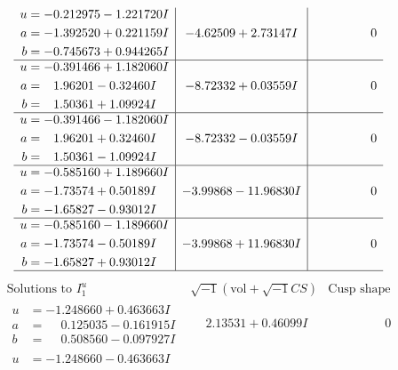 \documentclass[1p]{elsarticle_modified}
\theoremstyle{definition}
\newcommand{\I}{\sqrt{-1}}
\begin{document}
$$\begin{array}{c|c|c}
\begin{aligned}
u &= -0.212975 - 1.221720 I \\
a &= -1.392520 + 0.221159 I \\
b &= -0.745673 + 0.944265 I\end{aligned}
 & -4.62509 + 2.73147 I & \phantom{-0.000000 } 0 \\ \hline\begin{aligned}
u &= -0.391466 + 1.182060 I \\
a &= \phantom{-}1.96201 - 0.32460 I \\
b &= \phantom{-}1.50361 + 1.09924 I\end{aligned}
 & -8.72332 + 0.03559 I & \phantom{-0.000000 } 0 \\ \hline\begin{aligned}
u &= -0.391466 - 1.182060 I \\
a &= \phantom{-}1.96201 + 0.32460 I \\
b &= \phantom{-}1.50361 - 1.09924 I\end{aligned}
 & -8.72332 - 0.03559 I & \phantom{-0.000000 } 0 \\ \hline\begin{aligned}
u &= -0.585160 + 1.189660 I \\
a &= -1.73574 + 0.50189 I \\
b &= -1.65827 - 0.93012 I\end{aligned}
 & -3.99868 - 11.96830 I & \phantom{-0.000000 } 0 \\ \hline\begin{aligned}
u &= -0.585160 - 1.189660 I \\
a &= -1.73574 - 0.50189 I \\
b &= -1.65827 + 0.93012 I\end{aligned}
 & -3.99868 + 11.96830 I & \phantom{-0.000000 } 0\\
 \hline 
 \end{array}$$\newpage$$\begin{array}{c|c|c}  
\text{Solutions to }I^u_{1}& \I (\text{vol} + \sqrt{-1}CS) & \text{Cusp shape}\\
 \hline 
\begin{aligned}
u &= -1.248660 + 0.463663 I \\
a &= \phantom{-}0.125035 - 0.161915 I \\
b &= \phantom{-}0.508560 - 0.097927 I\end{aligned}
 & \phantom{-}2.13531 + 0.46099 I & \phantom{-0.000000 } 0 \\ \hline\begin{aligned}
u &= -1.248660 - 0.463663 I \\

\end{aligned}
\end{array}$$
\end{document}
